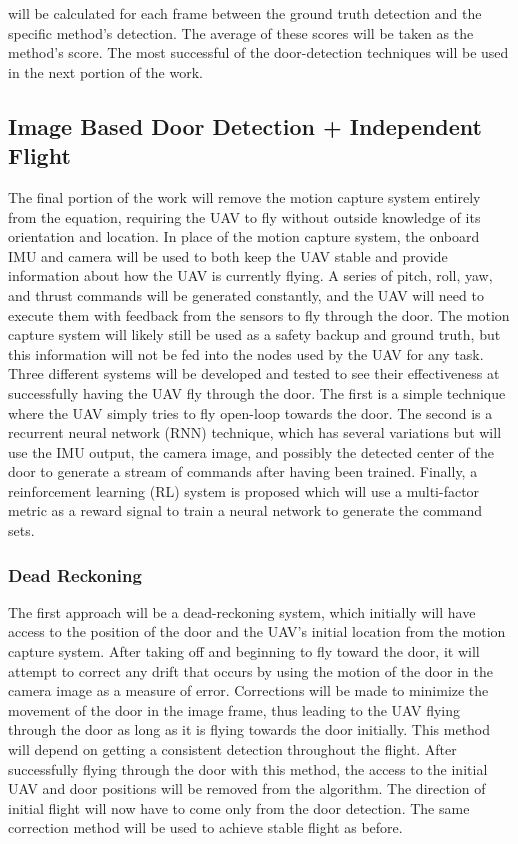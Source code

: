\documentclass[12pt]{article}
\begin{document}
will be calculated for each frame between the ground truth detection and the specific method's detection. The average of these scores will be taken as the method's score. The most successful of the door-detection techniques will be used in the next portion of the work.

\subsection{Image Based Door Detection + Independent Flight}
The final portion of the work will remove the motion capture system entirely from the equation, requiring the UAV to fly without outside knowledge of its orientation and location. In place of the motion capture system, the onboard IMU and camera will be used to both keep the UAV stable and provide information about how the UAV is currently flying. A series of pitch, roll, yaw, and thrust commands will be generated constantly, and the UAV will need to execute them with feedback from the sensors to fly through the door. The motion capture system will likely still be used as a safety backup and ground truth, but this information will not be fed into the nodes used by the UAV for any task. Three different systems will be developed and tested to see their effectiveness at successfully having the UAV fly through the door. The first is a simple technique where the UAV simply tries to fly open-loop towards the door. The second is a recurrent neural network (RNN) technique, which has several variations but will use the IMU output, the camera image, and possibly the detected center of the door to generate a stream of commands after having been trained. Finally, a reinforcement learning (RL) system is proposed which will use a multi-factor metric as a reward signal to train a neural network to generate the command sets. 

\subsubsection{Dead Reckoning}
The first approach will be a dead-reckoning system, which initially will have access to the position of the door and the UAV's initial location from the motion capture system. After taking off and beginning to fly toward the door, it will attempt to correct any drift that occurs by using the motion of the door in the camera image as a measure of error. Corrections will be made to minimize the movement of the door in the image frame, thus leading to the UAV flying through the door as long as it is flying towards the door initially. This method will depend on getting a consistent detection throughout the flight. After successfully flying through the door with this method, the access to the initial UAV and door positions will be removed from the algorithm. The direction of initial flight will now have to come only from the door detection. The same correction method will be used to achieve stable flight as before.
\end{document}
